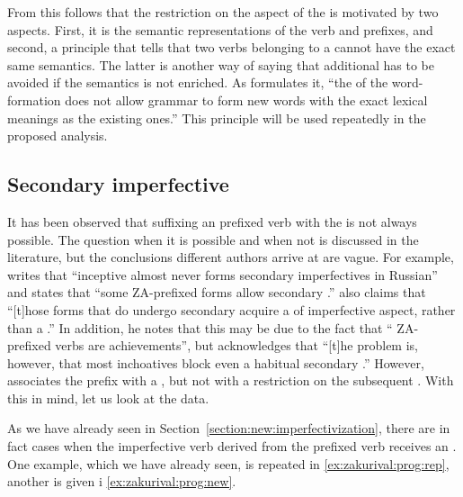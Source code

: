 From this follows that the restriction on the aspect of the  is motivated by two aspects. First, it is the semantic representations of the verb and prefixes, and second, a principle that tells that two verbs belonging to a  cannot have the exact same semantics. The latter is another way of saying that additional  has to be avoided if the semantics is not enriched. As \citet{Braginsky:08} formulates it, ``the  of the word-formation does not allow grammar to form new words with the
exact lexical meanings as the existing ones.'' This principle will be used repeatedly in the proposed analysis.


\subsection{Secondary imperfective}\largerpage
It has been observed that suffixing an  prefixed verb with the  is not always possible. The question when it is possible and when not is discussed in the literature, but the conclusions different authors arrive at are vague. For example, \citet[230]{Svenonius:04b} writes that ``inceptive  almost never forms secondary imperfectives in Russian'' and \citet[220]{Braginsky:08} states that ``some  ZA-prefixed forms allow secondary .'' \citet[231]{Braginsky:08} also claims that ``[t]hose  forms that do undergo secondary  acquire a  of imperfective aspect, rather than a .'' In addition, he notes that this may be due to the fact that `` ZA-prefixed verbs are achievements'', but acknowledges that ``[t]he problem is, however, that most inchoatives block even a habitual secondary .'' However, \citet{Tatevosov:09} associates the  prefix  with a , but not with a restriction on the subsequent . With this in mind, let us look at the data. 

As we have already seen in Section~\ref{section:new:imperfectivization}, there are in fact cases when the imperfective verb derived from the prefixed  verb receives an . One example, which we have already seen, is repeated in \ref{ex:zakurival:prog:rep}, another is given i \ref{ex:zakurival:prog:new}.

